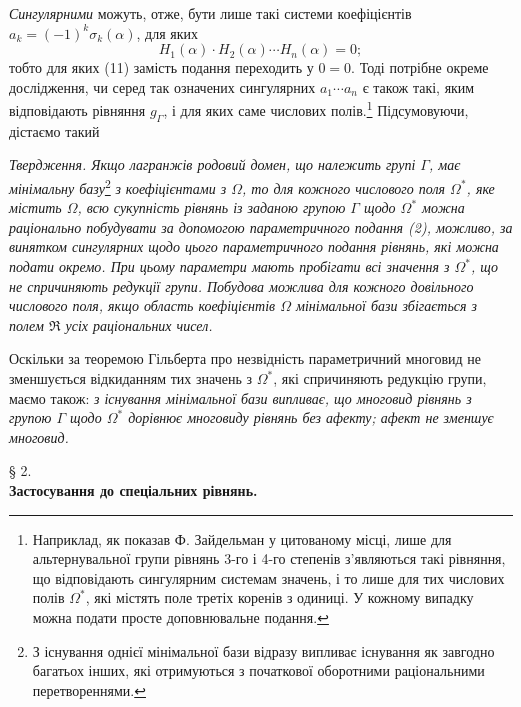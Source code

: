 \documentclass[11pt]{article}
\begin{document}
\emph{Сингулярними} можуть, отже, бути лише такі системи коефіцієнтів $a_k=(-1)^k\sigma_k(\alpha)$, для яких
\[
H_1(\alpha)\cdot H_2(\alpha)\cdots H_n(\alpha)=0;
\]
тобто для яких (11) замість подання переходить у $0=0$. Тоді потрібне окреме дослідження, чи серед так означених сингулярних $a_1\cdots a_n$ є також такі, яким відповідають рівняння $g_\Gamma$, і для яких саме числових полів.\footnote{Наприклад, як показав Ф. Зайдельман у цитованому місці, лише для альтернувальної групи рівнянь 3-го і 4-го степенів з'являються такі рівняння, що відповідають сингулярним системам значень, і то лише для тих числових полів $\Omega^*$, які містять поле третіх коренів з одиниці. У кожному випадку можна подати просте доповнювальне подання.} Підсумовуючи, дістаємо такий

\emph{Твердження. Якщо лагранжів родовий домен, що належить групі $\Gamma$, має мінімальну базу}\footnote{З існування однієї мінімальної бази відразу випливає існування як завгодно багатьох інших, які отримуються з початкової оборотними раціональними перетвореннями.} \emph{з коефіцієнтами з $\Omega$, то для кожного числового поля $\Omega^*$, яке містить $\Omega$, всю сукупність рівнянь із заданою групою $\Gamma$ щодо $\Omega^*$ можна раціонально побудувати за допомогою параметричного подання (2), можливо, за винятком сингулярних щодо цього параметричного подання рівнянь, які можна подати окремо. При цьому параметри мають пробігати всі значення з $\Omega^*$, що не спричиняють редукції групи. Побудова можлива для кожного довільного числового поля, якщо область коефіцієнтів $\Omega$ мінімальної бази збігається з полем $\mathfrak R$ усіх раціональних чисел.}

Оскільки за теоремою Гільберта про незвідність параметричний многовид не зменшується відкиданням тих значень з $\Omega^*$, які спричиняють редукцію групи, маємо також: \emph{з існування мінімальної бази випливає, що многовид рівнянь з групою $\Gamma$ щодо $\Omega^*$ дорівнює многовиду рівнянь без афекту; афект не зменшує многовид.}

\begin{center}
§ 2.\\[0.75\baselineskip]
\textbf{Застосування до спеціальних рівнянь.}
\end{center}
\end{document}
